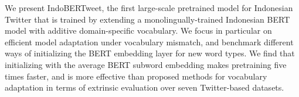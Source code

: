 We present IndoBERTweet, the first large-scale pretrained model for Indonesian Twitter that is trained by extending a monolingually-trained Indonesian BERT model with additive domain-specific vocabulary. We focus in particular on efficient model adaptation under vocabulary mismatch, and benchmark different ways of initializing the BERT embedding layer for new word types. We find that initializing with the average BERT subword embedding makes  pretraining five times faster, and is more effective than proposed methods for vocabulary adaptation in terms of extrinsic evaluation over seven Twitter-based datasets.
